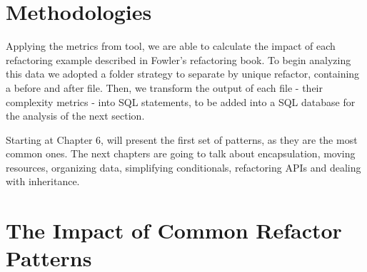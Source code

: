 \section{Methodologies}

Applying the metrics from \cite{article:mozilla} tool, we are able to calculate the impact of each refactoring example
described in Fowler's refactoring book. To begin analyzing this data we adopted a folder strategy to separate by unique refactor,
containing a before and after file. Then, we transform the output of each file - their complexity metrics - into SQL statements,
to be added into a SQL database for the analysis of the next section.

Starting at Chapter 6, \cite{book:refactoring} will present the first set of patterns, as they are the most common ones.
The next chapters are going to talk about encapsulation, moving resources, organizing data, simplifying conditionals,
refactoring APIs and dealing with inheritance.

\section{The Impact of Common Refactor Patterns}

